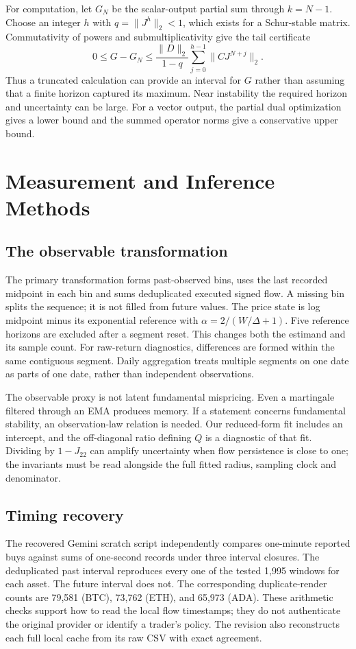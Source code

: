 For computation, let $G_N$ be the scalar-output partial sum through $k=N-1$. Choose an integer $h$ with $q=\|J^h\|_2<1$, which exists for a Schur-stable matrix. Commutativity of powers and submultiplicativity give the tail certificate
\[
0\le G-G_N\le
\frac{\|D\|_2}{1-q}\sum_{j=0}^{h-1}\|CJ^{N+j}\|_2.
\]
Thus a truncated calculation can provide an interval for $G$ rather than assuming that a finite horizon captured its maximum. Near instability the required horizon and uncertainty can be large. For a vector output, the partial dual optimization gives a lower bound and the summed operator norms give a conservative upper bound.

\section{Measurement and Inference Methods}
\subsection{The observable transformation}
The primary transformation forms past-observed bins, uses the last recorded midpoint in each bin and sums deduplicated executed signed flow. A missing bin splits the sequence; it is not filled from future values. The price state is log midpoint minus its exponential reference with $\alpha=2/(W/\Delta+1)$. Five reference horizons are excluded after a segment reset. This changes both the estimand and its sample count. For raw-return diagnostics, differences are formed within the same contiguous segment. Daily aggregation treats multiple segments on one date as parts of one date, rather than independent observations.

The observable proxy is not latent fundamental mispricing. Even a martingale filtered through an EMA produces memory. If a statement concerns fundamental stability, an observation-law relation is needed. Our reduced-form fit includes an intercept, and the off-diagonal ratio defining $Q$ is a diagnostic of that fit. Dividing by $1-J_{22}$ can amplify uncertainty when flow persistence is close to one; the invariants must be read alongside the full fitted radius, sampling clock and denominator.

\subsection{Timing recovery}
The recovered Gemini scratch script independently compares one-minute reported buys against sums of one-second records under three interval closures. The deduplicated past interval reproduces every one of the tested 1,995 windows for each asset. The future interval does not. The corresponding duplicate-render counts are 79,581 (BTC), 73,762 (ETH), and 65,973 (ADA). These arithmetic checks support how to read the local flow timestamps; they do not authenticate the original provider or identify a trader's policy. The revision also reconstructs each full local cache from its raw CSV with exact agreement.


